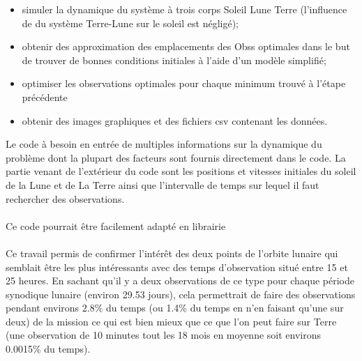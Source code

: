 \documentclass{article} %
\begin{document}
		\begin{itemize}
			\item simuler la dynamique du système à trois corps Soleil Lune Terre (l'influence de du système Terre-Lune sur le soleil est négligé);
			\item obtenir des approximation des emplacements des \glspl{Obs} optimales dans le but de trouver de bonnes conditions initiales à l'aide d'un modèle simplifié;
			\item optimiser les observations optimales pour chaque minimum trouvé à l'étape précédente
			\item obtenir des images graphiques et des fichiers csv contenant les données.
		\end{itemize}
		
		Le code à besoin en entrée de multiples informations sur la dynamique du problème dont la plupart des facteurs sont fournis directement dans le code. La partie venant de l'extérieur du code sont les positions et vitesses initiales du soleil de la Lune et de La Terre ainsi que l'intervalle de temps sur lequel il faut rechercher des observations.
		\\ \\
		Ce code pourrait être facilement adapté en librairie
		\\ \\	
		Ce travail permis de confirmer l'intérêt des deux points de l'orbite lunaire qui semblait être les plus intéressants avec des temps d'observation situé entre 15 et 25 heures. En sachant qu'il y a deux observations de ce type pour chaque période synodique lunaire (environ 29.53 jours), cela permettrait de faire des observations pendant environs 2.8\% du temps (ou 1.4\% du temps en n'en faisant qu'une sur deux) de la mission ce qui est bien mieux que ce que l'on peut faire sur Terre (une observation de 10 minutes tout les 18 mois en moyenne soit environs 0.0015\% du temps).
		
\end{document}
